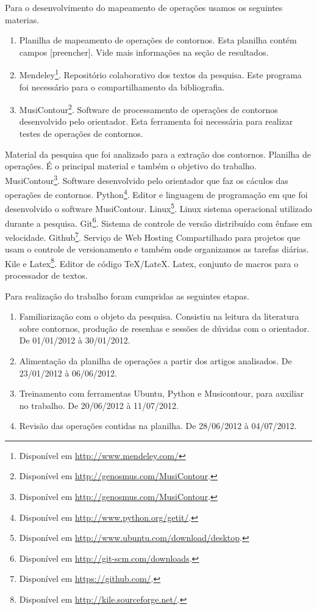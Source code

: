\documentclass[11pt]{article}
\begin{document}
Para o desenvolvimento do mapeamento de operações usamos os seguintes
materias.


\begin{enumerate}
\item Planilha de mapeamento de operações de contornos. Esta planilha
  contém campos [preencher]. Vide mais informações na seção de
  resultados.
\item Mendeley\footnote{Disponível em
    \url{http://www.mendeley.com/}}. Repositório colaborativo dos
  textos da pesquisa. Este programa foi necessário para o
  compartilhamento da bibliografia.
\item MusiContour\footnote{Disponível em
    \url{http://genosmus.com/MusiContour}.}. Software de processamento
  de operações de contornos desenvolvido pelo orientador. Esta
  ferramenta foi necessária para realizar testes de operações de
  contornos.
\end{enumerate}


Material da pesquisa que foi analizado para a extração dos contornos.
Planilha de operações. É o principal material e também o
objetivo do trabalho.
MusiContour\footnote{Disponível em
  \url{http://genosmus.com/MusiContour}.}. Software desenvolvido pelo
orientador que faz os cáculos das operações de contornos.
Python\footnote{Disponível em
  \url{http://www.python.org/getit/}.}. Editor e linguagem de
programação em que foi desenvolvido o software MusiContour.
Linux\footnote{Disponível em
  \url{http://www.ubuntu.com/download/desktop}.}. Linux sistema
operacional utilizado durante a pesquisa.  Git\footnote{Disponível em
  \url{http://git-scm.com/downloads}.}. Sistema de controle de versão
distribuído com ênfase em velocidade.  Github\footnote{Disponível em
  \url{https://github.com/}.}. Serviço de Web Hosting Compartilhado
para projetos que usam o controle de versionamento e também onde
organizamos as tarefas diárias.  Kile e Latex\footnote{Disponível em
  \url{http://kile.sourceforge.net/}.}. Editor de código
TeX/LateX. Latex, conjunto de macros para o processador de textos.

Para realização do trabalho foram cumpridas as seguintes etapas.

\begin{enumerate}
\item Familiarização com o objeto da pesquisa. Consistiu na leitura da
  literatura sobre contornos, produção de resenhas e sessões de dúvidas
  com o orientador. De 01/01/2012 à 30/01/2012.
\item Alimentação da planilha de operações a partir dos artigos
  analisados. De 23/01/2012 à 06/06/2012.
\item Treinamento com ferramentas Ubuntu, Python e Musicontour, para
  auxiliar no trabalho. De 20/06/2012 à 11/07/2012.
\item Revisão das operações contidas na planilha. De 28/06/2012 à 04/07/2012.
\end{enumerate}
\end{document}
